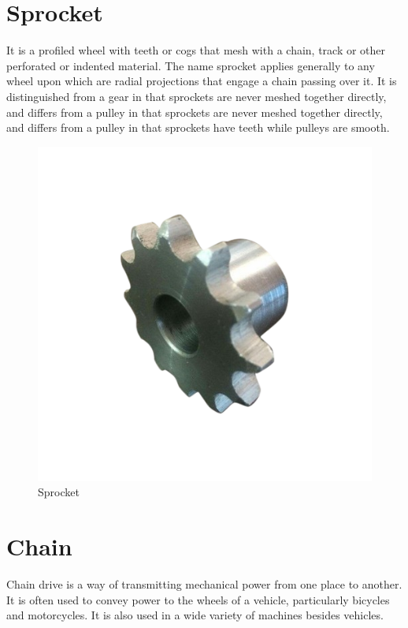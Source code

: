 \section{Sprocket} \label{Sprocket}
It is a profiled wheel with teeth or cogs that mesh with a chain, track or other perforated or indented material. The name sprocket applies generally to any wheel upon which are radial projections that engage a chain passing over it. It is distinguished from a gear in that sprockets are never meshed together directly, and differs from a pulley in that sprockets are never meshed together directly, and differs from a pulley in that sprockets have teeth while pulleys are smooth.
\begin{figure}[h!]
\center
\includegraphics[scale=0.3]{12tsproket}
\caption{Sprocket}
\end{figure}


\section{Chain} \label{Chain}
Chain drive is a way of transmitting mechanical power from one place to another. It is often used to convey power to the wheels of a vehicle, particularly bicycles and motorcycles. It is also used in a wide variety of machines besides vehicles.

